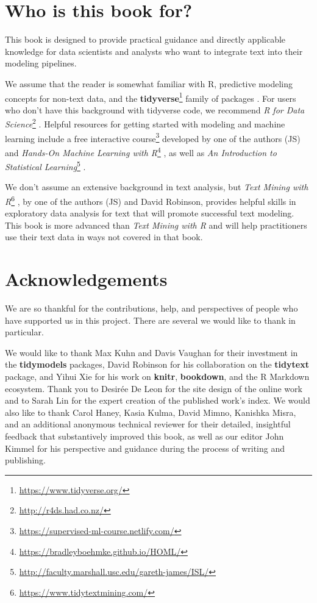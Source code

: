 \documentclass[
]{krantz}
\DeclareRobustCommand{\href}[2]{#2\footnote{\url{#1}}}
\renewcommand{\href}[2]{#2\footnote{\url{#1}}}
\begin{document}
\hypertarget{who-is-this-book-for}{%
\section*{Who is this book for?}\label{who-is-this-book-for}}


This book is designed to provide practical guidance and directly applicable knowledge for data scientists and analysts who want to integrate text into their modeling pipelines.

We assume that the reader is somewhat familiar with R, predictive modeling concepts for non-text data, and the \href{https://www.tidyverse.org/}{\textbf{tidyverse}} family of packages \citep{Wickham2019}. For users who don't have this background with tidyverse code, we recommend \href{http://r4ds.had.co.nz/}{\emph{R for Data Science}} \citep{Wickham2017}. Helpful resources for getting started with modeling and machine learning include a \href{https://supervised-ml-course.netlify.com/}{free interactive course} developed by one of the authors (JS) and \href{https://bradleyboehmke.github.io/HOML/}{\emph{Hands-On Machine Learning with R}} \citep{Boehmke2019}, as well as \href{http://faculty.marshall.usc.edu/gareth-james/ISL/}{\emph{An Introduction to Statistical Learning}} \citep{James2013}.

We don't assume an extensive background in text analysis, but \href{https://www.tidytextmining.com/}{\emph{Text Mining with R}} \citep{Silge2017}, by one of the authors (JS) and David Robinson, provides helpful skills in exploratory data analysis for text that will promote successful text modeling. This book is more advanced than \emph{Text Mining with R} and will help practitioners use their text data in ways not covered in that book.

\hypertarget{acknowledgements}{%
\section*{Acknowledgements}\label{acknowledgements}}


We are so thankful for the contributions, help, and perspectives of people who have supported us in this project. There are several we would like to thank in particular.

We would like to thank Max Kuhn and Davis Vaughan for their investment in the \textbf{tidymodels} packages, David Robinson for his collaboration on the \textbf{tidytext} package, and Yihui Xie for his work on \textbf{knitr}, \textbf{bookdown}, and the R Markdown ecosystem. Thank you to Desirée De Leon for the site design of the online work and to Sarah Lin for the expert creation of the published work's index. We would also like to thank Carol Haney, Kasia Kulma, David Mimno, Kanishka Misra, and an additional anonymous technical reviewer for their detailed, insightful feedback that substantively improved this book, as well as our editor John Kimmel for his perspective and guidance during the process of writing and publishing.
\end{document}
